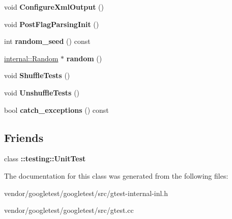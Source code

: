 \begin{DoxyCompactItemize}
void {\bfseries Configure\+Xml\+Output} ()
\item 
\mbox{\label{classtesting_1_1internal_1_1_unit_test_impl_a772894193104b1b2516f16e6ff813168}} 
void {\bfseries Post\+Flag\+Parsing\+Init} ()
\item 
\mbox{\label{classtesting_1_1internal_1_1_unit_test_impl_a625b9fb6d17b008c44fc902255e6343c}} 
int {\bfseries random\+\_\+seed} () const
\item 
\mbox{\label{classtesting_1_1internal_1_1_unit_test_impl_ab3b45b5eb4d583219a3602011ea44347}} 
\mbox{\hyperlink{classtesting_1_1internal_1_1_random}{internal\+::\+Random}} $\ast$ {\bfseries random} ()
\item 
\mbox{\label{classtesting_1_1internal_1_1_unit_test_impl_aaaa38e6a4372e6bb9bbe3143a3a32b65}} 
void {\bfseries Shuffle\+Tests} ()
\item 
\mbox{\label{classtesting_1_1internal_1_1_unit_test_impl_a1ee7db3bf8284dd9dce4dc857564bce3}} 
void {\bfseries Unshuffle\+Tests} ()
\item 
\mbox{\label{classtesting_1_1internal_1_1_unit_test_impl_aa311b980783a9cfb547831f7b19e3f3a}} 
bool {\bfseries catch\+\_\+exceptions} () const
\end{DoxyCompactItemize}
\subsection*{Friends}
\begin{DoxyCompactItemize}
\item 
\mbox{\label{classtesting_1_1internal_1_1_unit_test_impl_a893404438388dec058dc5c02e8f9a014}} 
class {\bfseries \+::testing\+::\+Unit\+Test}
\end{DoxyCompactItemize}


The documentation for this class was generated from the following files\+:\begin{DoxyCompactItemize}
\item 
vendor/googletest/googletest/src/gtest-\/internal-\/inl.\+h\item 
vendor/googletest/googletest/src/gtest.\+cc\end{DoxyCompactItemize}
